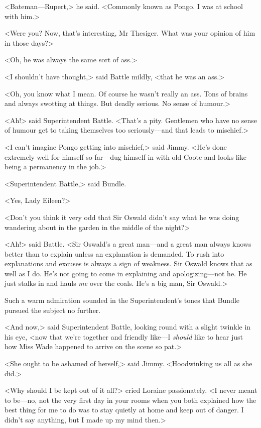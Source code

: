 <Bateman—Rupert,> he said. <Commonly known as Pongo. I was at school with him.>

<Were you? Now, that's interesting, Mr Thesiger. What was your opinion of him in those days?>

<Oh, he was always the same sort of ass.>

<I shouldn't have thought,> said Battle mildly, <that he was an ass.>

<Oh, you know what I mean. Of course he wasn't really an ass. Tons of brains and always swotting at things. But deadly serious. No sense of humour.>

<Ah!> said Superintendent Battle. <That's a pity. Gentlemen who have no sense of humour get to taking themselves too seriously—and that leads to mischief.>

<I can't imagine Pongo getting into mischief,> said Jimmy. <He's done extremely well for himself so far—dug himself in with old Coote and looks like being a permanency in the job.>

<Superintendent Battle,> said Bundle.

<Yes, Lady Eileen?>

<Don't you think it very odd that Sir Oswald didn't say what he was doing wandering about in the garden in the middle of the night?>

<Ah!> said Battle. <Sir Oswald's a great man—and a great man always knows better than to explain unless an explanation is demanded. To rush into explanations and excuses is always a sign of weakness. Sir Oswald knows that as well as I do. He's not going to come in explaining and apologizing—not he. He just stalks in and hauls \emph{me} over the coals. He's a big man, Sir Oswald.>

Such a warm admiration sounded in the Superintendent's tones that Bundle pursued the subject no further.

<And now,> said Superintendent Battle, looking round with a slight twinkle in his eye, <now that we're together and friendly like—I \emph{should} like to hear just how Miss Wade happened to arrive on the scene so pat.>

<She ought to be ashamed of herself,> said Jimmy. <Hoodwinking us all as she did.>

<Why should I be kept out of it all?> cried Loraine passionately. <I never meant to be—no, not the very first day in your rooms when you both explained how the best thing for me to do was to stay quietly at home and keep out of danger. I didn't say anything, but I made up my mind then.>

